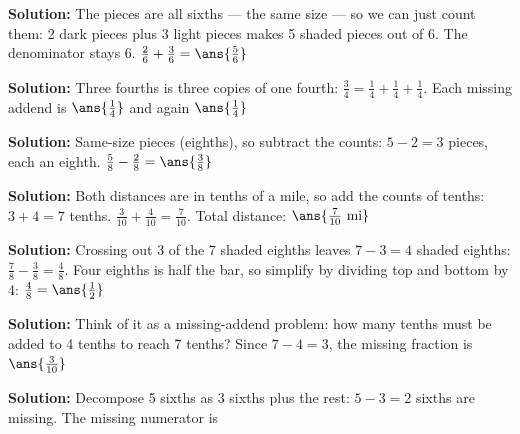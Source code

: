 \documentclass[12pt]{article}
\begin{document}



\textbf{Solution:} The pieces are all sixths --- the same size --- so we can
just count them: 2 dark pieces plus 3 light pieces makes 5 shaded pieces out
of 6. The denominator stays 6.
$\tfrac{2}{6} + \tfrac{3}{6} = \ans{\tfrac{5}{6}}$


\textbf{Solution:} Three fourths is three copies of one fourth:
$\tfrac{3}{4} = \tfrac{1}{4} + \tfrac{1}{4} + \tfrac{1}{4}$.
Each missing addend is $\ans{\tfrac{1}{4}}$ and again $\ans{\tfrac{1}{4}}$


\textbf{Solution:} Same-size pieces (eighths), so subtract the counts:
$5 - 2 = 3$ pieces, each an eighth.
$\tfrac{5}{8} - \tfrac{2}{8} = \ans{\tfrac{3}{8}}$


\textbf{Solution:} Both distances are in tenths of a mile, so add the counts
of tenths: $3 + 4 = 7$ tenths.
$\tfrac{3}{10} + \tfrac{4}{10} = \tfrac{7}{10}$. Total distance:
$\ans{\tfrac{7}{10}\ \text{mi}}$


\textbf{Solution:} Crossing out 3 of the 7 shaded eighths leaves $7 - 3 = 4$
shaded eighths: $\tfrac{7}{8} - \tfrac{3}{8} = \tfrac{4}{8}$. Four eighths is
half the bar, so simplify by dividing top and bottom by 4:
$\tfrac{4}{8} = \ans{\tfrac{1}{2}}$


\textbf{Solution:} Think of it as a missing-addend problem: how many tenths
must be added to 4 tenths to reach 7 tenths? Since $7 - 4 = 3$, the missing
fraction is $\ans{\tfrac{3}{10}}$


\textbf{Solution:} Decompose 5 sixths as 3 sixths plus the rest:
$5 - 3 = 2$ sixths are missing. The missing numerator is 
\end{document}
